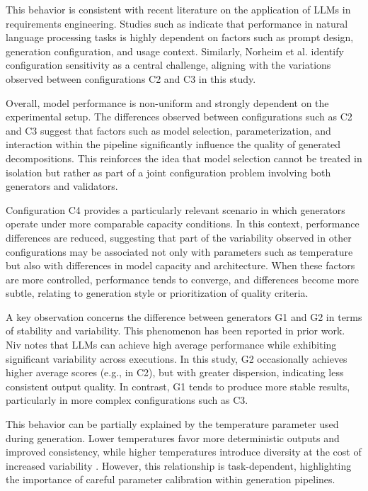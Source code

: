\documentclass[pdflatex,sn-mathphys-num]{sn-jnl}%
\theoremstyle{thmstyleone}%
\theoremstyle{thmstyletwo}%
\theoremstyle{thmstylethree}%
\begin{document}
This behavior is consistent with recent literature on the application of LLMs in requirements engineering. Studies such as \cite{zadenoori2025} indicate that performance in natural language processing tasks is highly dependent on factors such as prompt design, generation configuration, and usage context. Similarly, Norheim et al. \cite{sami2024} identify configuration sensitivity as a central challenge, aligning with the variations observed between configurations C2 and C3 in this study.

Overall, model performance is non-uniform and strongly dependent on the experimental setup. The differences observed between configurations such as C2 and C3 suggest that factors such as model selection, parameterization, and interaction within the pipeline significantly influence the quality of generated decompositions. This reinforces the idea that model selection cannot be treated in isolation but rather as part of a joint configuration problem involving both generators and validators.

Configuration C4 provides a particularly relevant scenario in which generators operate under more comparable capacity conditions. In this context, performance differences are reduced, suggesting that part of the variability observed in other configurations may be associated not only with parameters such as temperature but also with differences in model capacity and architecture. When these factors are more controlled, performance tends to converge, and differences become more subtle, relating to generation style or prioritization of quality criteria.

A key observation concerns the difference between generators G1 and G2 in terms of stability and variability. This phenomenon has been reported in prior work. Niv \cite{hematt2025} notes that LLMs can achieve high average performance while exhibiting significant variability across executions. In this study, G2 occasionally achieves higher average scores (e.g., in C2), but with greater dispersion, indicating less consistent output quality. In contrast, G1 tends to produce more stable results, particularly in more complex configurations such as C3.

This behavior can be partially explained by the temperature parameter used during generation. Lower temperatures favor more deterministic outputs and improved consistency, while higher temperatures introduce diversity at the cost of increased variability \cite{li2026temp}. However, this relationship is task-dependent, highlighting the importance of careful parameter calibration within generation pipelines.
\end{document}
